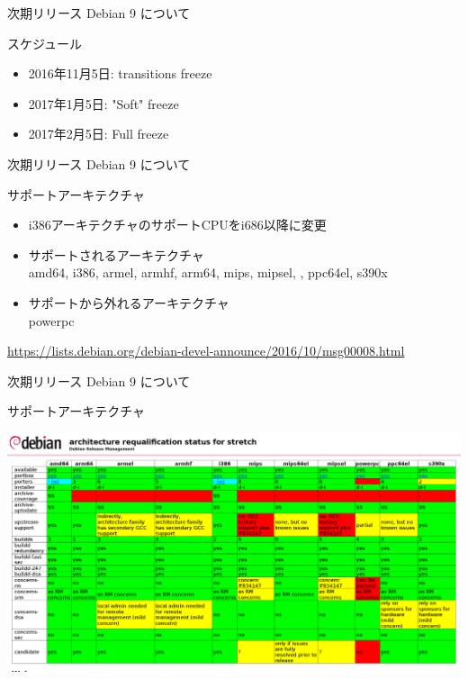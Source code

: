 \begin{frame}{次期リリース Debian 9 について}%

スケジュール

\begin{itemize}
\item 2016年11月5日: transitions freeze
\item 2017年1月5日: "Soft" freeze
\item 2017年2月5日: Full freeze
\end{itemize}

\end{frame}

\begin{frame}{次期リリース Debian 9 について}%

サポートアーキテクチャ
\begin{itemize}
\item i386アーキテクチャのサポートCPUをi686以降に変更
\item サポートされるアーキテクチャ \\
  amd64, i386, armel, armhf, arm64, mips, mipsel, {\color{red}{mips64el}}, ppc64el, s390x
\item サポートから外れるアーキテクチャ \\
  powerpc 
\end{itemize}

\tiny{\url{https://lists.debian.org/debian-devel-announce/2016/10/msg00008.html}}

\end{frame}

\begin{frame}{次期リリース Debian 9 について}%

サポートアーキテクチャ
 \begin{center}
 \includegraphics[width=1.0\hsize]{image201611/stretch-arch-requalification.png}
 \end{center}

\end{frame}

